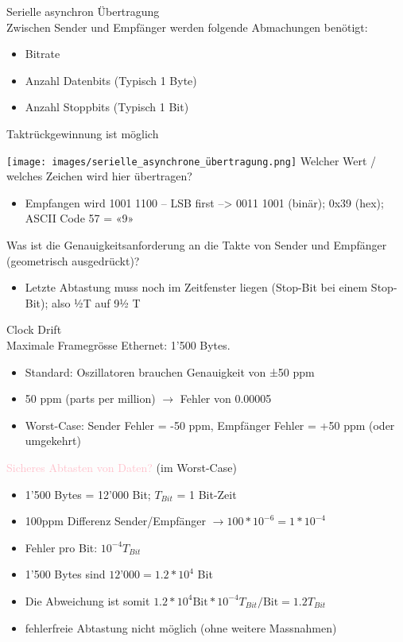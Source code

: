 \begin{definition}{Serielle asynchron Übertragung}\\
    Zwischen Sender und Empfänger werden folgende Abmachungen benötigt:
    \begin{itemize}
        \item Bitrate
        \item Anzahl Datenbits (Typisch 1 Byte)
        \item Anzahl Stoppbits (Typisch 1 Bit)
    \end{itemize}
    Taktrückgewinnung ist möglich
\end{definition}

\begin{example}
    \texttt{[image: images/serielle\_asynchrone\_übertragung.png]}
    Welcher Wert / welches Zeichen wird hier übertragen?
    \begin{itemize}
        \item Empfangen wird 1001 1100 – LSB first –> 0011 1001 (binär); 0x39 (hex); ASCII Code 57 = «9»
    \end{itemize}
    Was ist die Genauigkeitsanforderung an die Takte von Sender und Empfänger (geometrisch
    ausgedrückt)?
    \begin{itemize}
        \item Letzte Abtastung muss noch im Zeitfenster liegen (Stop-Bit bei einem Stop-Bit); also ½T auf 9½ T
    \end{itemize}
\end{example}

\begin{KR}{Clock Drift}\\
    Maximale Framegrösse Ethernet: 1’500 Bytes.
    \begin{itemize}
        \item Standard: Oszillatoren brauchen Genauigkeit von ±50 ppm 
        \item 50 ppm (parts per million) $\rightarrow$ Fehler von 0.00005
        \item Worst-Case: Sender Fehler = -50 ppm, Empfänger Fehler = +50 ppm (oder umgekehrt)
    \end{itemize}
    \textcolor{pink}{Sicheres Abtasten von Daten?} (im Worst-Case)
    \begin{itemize}
        \item 1'500 Bytes = 12'000 Bit; $T_{Bit}$ = 1 Bit-Zeit
        \item 100ppm Differenz Sender/Empfänger $\rightarrow 100 * 10^{-6} = 1 * 10^{-4}$
        \item Fehler pro Bit: $10^{-4} T_{Bit}$
        \item 1’500 Bytes sind $12’000 = 1.2 * 10^4$ Bit
        \item Die Abweichung ist somit $1.2 * 10^4 \text{Bit} * 10^{-4} T_{Bit} / \text{Bit} = 1.2 T_{Bit}$
        \item fehlerfreie Abtastung nicht möglich (ohne weitere Massnahmen)
    \end{itemize}
\end{KR}

